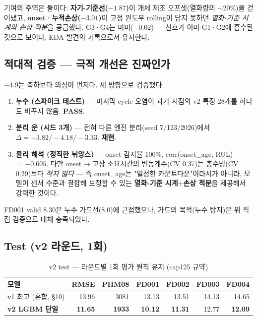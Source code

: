 \documentclass[11pt]{article}
\begin{document}
기여의 주역은 둘이다: \textbf{자기-기준선($-1.87$)}이 개체 제조 오프셋(열화량의 $\sim$20\%)을 걷어냈고,
\textbf{onset·누적손상($-3.01$)}이 고정 윈도우 rolling이 담지 못하던 \emph{열화-기준 시계와 손상 적분}을 공급했다.
G3·G4는 미미($-0.02$) — 신호가 이미 G1·G2에 흡수된 것으로 보이나, EDA 발견의 기록으로서 유지한다.

\subsection{적대적 검증 — 극적 개선은 진짜인가}

$-4.9$는 축하보다 의심이 먼저다. 세 방향으로 검증했다.

\begin{enumerate}[nosep]
  \item \textbf{누수 (스파이크 테스트)} — 마지막 cycle 오염이 과거 시점의 v2 특징 28개를 하나도 바꾸지 않음. \textbf{PASS}.
  \item \textbf{분리 운 (시드 3개)} — 전혀 다른 엔진 분리(seed 7/123/2026)에서 $\Delta = -3.82 / -4.18 / -3.33$. \textbf{재현}.
  \item \textbf{물리 해석 (정직한 뉘앙스)} — onset 감지율 100\%, corr(onset\_age, RUL) $=-0.605$.
        다만 onset$\to$고장 소요시간의 변동계수(CV 0.37)는 총수명(CV 0.29)보다 \emph{작지 않다} —
        즉 onset\_age는 "일정한 카운트다운"이라서가 아니라, 모델이 센서 수준과 결합해 보정할 수 있는
        \textbf{열화-기준 시계$+$손상 적분}을 제공해서 강력한 것이다.
\end{enumerate}

FD001 valid 8.30은 누수 가드선(8.0)에 근접했으나, 가드의 목적(누수 탐지)은 위 직접 검증으로 대체 충족되었다.

\subsection{Test (v2 라운드, 1회)}

\begin{table}[H]
\centering
\caption{v2 test — 라운드별 1회 평가 원칙 유지 (cap125 규약)}
\label{tab:v2test}
\begin{tabular}{lrrrrrr}
\toprule
모델 & RMSE & PHM08 & FD001 & FD002 & FD003 & FD004 \\
\midrule
v1 최고 (혼합, \S10) & 13.96 & 3081 & 13.13 & 13.51 & 14.13 & 14.65 \\
\textbf{v2 LGBM 단일} & \textbf{11.65} & \textbf{1933} & \textbf{10.12} & \textbf{11.31} & 12.77 & \textbf{12.09} \\
\bottomrule
\end{tabular}
\end{table}
\end{document}
